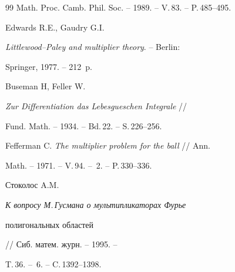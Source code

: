 \begin{thebibliography}{99}
Math. Proc. Camb. Phil. Soc. -- 1989. -- V.\,83. -- P.\,485--495.




Edwards R.E., Gaudry G.I.


{\it Littlewood--Paley and multiplier theory}. -- Berlin:


Springer, 1977. -- 212~p.




Buseman H, Feller W.


{\it Zur Differentiation das Lebesgueschen Integrale} //


Fund. Math. -- 1934. -- Bd.\,22. -- S.\,226--256.




Fefferman C. {\it The multiplier problem for the ball} // Ann.


Math. -- 1971. -- V.\,94. -- \No\,2. -- P.\,330--336.




Стоколос A.M. {\it К вопросу М.\,Гусмана о мультипликаторах Фурье


полигональных областей} // Сиб. матем. журн. -- 1995. --


T.\,36. -- \No\,6. -- C.\,1392--1398.





\end{thebibliography}





\vskip 2cm











\label{end}





